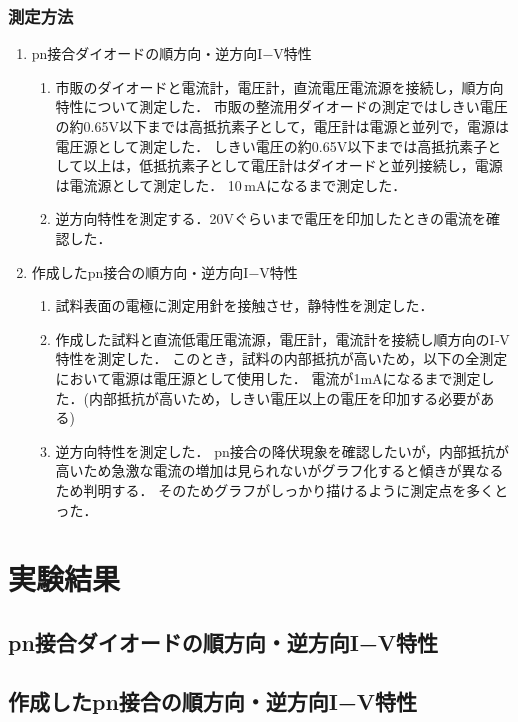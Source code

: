 \documentclass[11pt]{jarticle}
\begin{document}
		\subsubsection{測定方法}
			\begin{enumerate}
				\item pn接合ダイオードの順方向・逆方向I−V特性\\
					\begin{enumerate}
						\item 市販のダイオードと電流計，電圧計，直流電圧電流源を接続し，順方向特性について測定した．
							  市販の整流用ダイオードの測定ではしきい電圧の約0.65V以下までは高抵抗素子として，電圧計は電源と並列で，電源は電圧源として測定した．
							  しきい電圧の約0.65V以下までは高抵抗素子として以上は，低抵抗素子として電圧計はダイオードと並列接続し，電源は電流源として測定した．
							  10\,mAになるまで測定した．
						\item 逆方向特性を測定する．20Vぐらいまで電圧を印加したときの電流を確認した．
					\end{enumerate}
				\item 作成したpn接合の順方向・逆方向I−V特性\\
					\begin{enumerate}
						\item 試料表面の電極に測定用針を接触させ，静特性を測定した．
						\item 作成した試料と直流低電圧電流源，電圧計，電流計を接続し順方向のI‐V特性を測定した．
							  このとき，試料の内部抵抗が高いため，以下の全測定において電源は電圧源として使用した．
							  電流が1mAになるまで測定した．(内部抵抗が高いため，しきい電圧以上の電圧を印加する必要がある)
						\item 逆方向特性を測定した．
							  pn接合の降伏現象を確認したいが，内部抵抗が高いため急激な電流の増加は見られないがグラフ化すると傾きが異なるため判明する．
							  そのためグラフがしっかり描けるように測定点を多くとった．
					\end{enumerate}
			\end{enumerate}

\section{実験結果}
	\subsection{pn接合ダイオードの順方向・逆方向I−V特性}
	\subsection{作成したpn接合の順方向・逆方向I−V特性}
\end{document}
